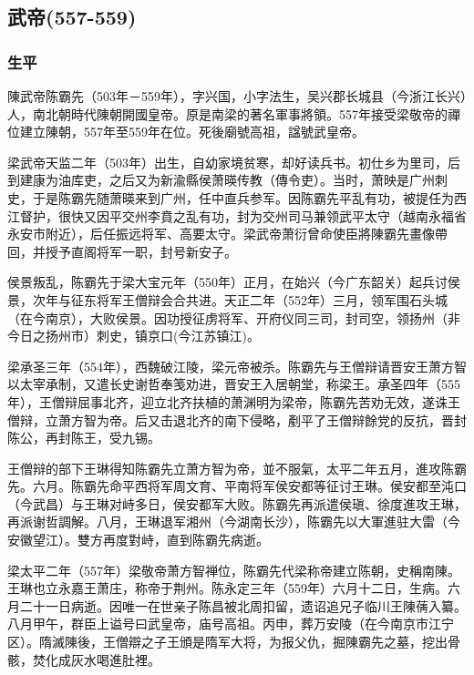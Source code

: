 
\subsection{武帝\tiny(557-559)}

\subsubsection{生平}

陳武帝陈霸先（503年－559年），字兴国，小字法生，吴兴郡长城县（今浙江长兴）人，南北朝時代陳朝開國皇帝。原是南梁的著名軍事將領。557年接受梁敬帝的禪位建立陳朝，557年至559年在位。死後廟號高祖，諡號武皇帝。

梁武帝天监二年（503年）出生，自幼家境贫寒，却好读兵书。初仕乡为里司，后到建康为油库吏，之后又为新渝縣侯萧暎传教（傳令吏）。当时，萧映是广州刺史，于是陈霸先随萧暎来到广州，任中直兵参军。因陈霸先平乱有功，被提任为西江督护，很快又因平交州李賁之乱有功，封为交州司马兼领武平太守（越南永福省永安市附近），后任振远将军、高要太守。梁武帝萧衍曾命使臣將陳霸先畫像帶回，并授予直阁将军一职，封号新安子。

侯景叛乱，陈霸先于梁大宝元年（550年）正月，在始兴（今广东韶关）起兵讨侯景，次年与征东将军王僧辩会合共进。天正二年（552年）三月，领军围石头城（在今南京），大败侯景。因功授征虏将军、开府仪同三司，封司空，领扬州（非今日之扬州市）刺史，镇京口(今江苏镇江)。

梁承圣三年（554年），西魏破江陵，梁元帝被杀。陈霸先与王僧辩请晋安王萧方智以太宰承制，又遣长史谢哲奉笺劝进，晋安王入居朝堂，称梁王。承圣四年（555年），王僧辩屈事北齐，迎立北齐扶植的萧渊明为梁帝，陈霸先苦劝无效，遂诛王僧辩，立萧方智为帝。后又击退北齐的南下侵略，剷平了王僧辩餘党的反抗，晋封陈公，再封陈王，受九锡。

王僧辩的部下王琳得知陈霸先立萧方智为帝，並不服氣，太平二年五月，進攻陈霸先。六月。陈霸先命平西将军周文育、平南将军侯安都等征讨王琳。侯安都至沌口（今武昌）与王琳对峙多日，侯安都军大败。陈霸先再派遣侯瑱、徐度進攻王琳，再派谢哲調解。八月，王琳退军湘州（今湖南长沙），陈霸先以大軍進驻大雷（今安徽望江）。雙方再度對峙，直到陈霸先病逝。

梁太平二年（557年）梁敬帝萧方智禅位，陈霸先代梁称帝建立陈朝，史稱南陳。王琳也立永嘉王萧庄，称帝于荆州。陈永定三年（559年）六月十二日，生病。六月二十一日病逝。因唯一在世亲子陈昌被北周扣留，遗诏追兄子临川王陳蒨入纂。八月甲午，群臣上谥号曰武皇帝，庙号高祖。丙申，葬万安陵（在今南京市江宁区）。隋滅陳後，王僧辯之子王頒是隋军大将，为报父仇，掘陳霸先之墓，挖出骨骸，焚化成灰水喝進肚裡。

